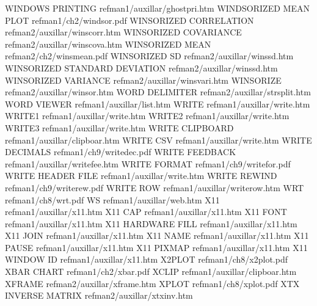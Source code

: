 WINDOWS PRINTING                        refman1/auxillar/ghostpri.htm
WINDSORIZED MEAN PLOT                   refman1/ch2/windsor.pdf
WINSORIZED CORRELATION                  refman2/auxillar/winscorr.htm
WINSORIZED COVARIANCE                   refman2/auxillar/winscova.htm
WINSORIZED MEAN                         refman2/ch2/winsmean.pdf
WINSORIZED SD                           refman2/auxillar/winssd.htm
WINSORIZED STANDARD DEVIATION           refman2/auxillar/winssd.htm
WINSORIZED VARIANCE                     refman2/auxillar/winsvari.htm
WINSORIZE                               refman2/auxillar/winsor.htm
WORD DELIMITER                          refman2/auxillar/strsplit.htm
WORD VIEWER                             refman1/auxillar/list.htm
WRITE                                   refman1/auxillar/write.htm
WRITE1                                  refman1/auxillar/write.htm
WRITE2                                  refman1/auxillar/write.htm
WRITE3                                  refman1/auxillar/write.htm
WRITE CLIPBOARD                         refman1/auxillar/clipboar.htm
WRITE CSV                               refman1/auxillar/write.htm
WRITE DECIMALS                          refman1/ch9/writedec.pdf
WRITE FEEDBACK                          refman1/auxillar/writefee.htm
WRITE FORMAT                            refman1/ch9/writefor.pdf
WRITE HEADER FILE                       refman1/auxillar/write.htm
WRITE REWIND                            refman1/ch9/writerew.pdf
WRITE ROW                               refman1/auxillar/writerow.htm
WRT                                     refman1/ch8/wrt.pdf
WS                                      refman1/auxillar/web.htm
X11                                     refman1/auxillar/x11.htm
X11 CAP                                 refman1/auxillar/x11.htm
X11 FONT                                refman1/auxillar/x11.htm
X11 HARDWARE FILL                       refman1/auxillar/x11.htm
X11 JOIN                                refman1/auxillar/x11.htm
X11 NAME                                refman1/auxillar/x11.htm
X11 PAUSE                               refman1/auxillar/x11.htm
X11 PIXMAP                              refman1/auxillar/x11.htm
X11 WINDOW ID                           refman1/auxillar/x11.htm
X2PLOT                                  refman1/ch8/x2plot.pdf
XBAR CHART                              refman1/ch2/xbar.pdf
XCLIP                                   refman1/auxillar/clipboar.htm
XFRAME                                  refman2/auxillar/xframe.htm
XPLOT                                   refman1/ch8/xplot.pdf
XTX INVERSE MATRIX                      refman2/auxillar/xtxinv.htm
